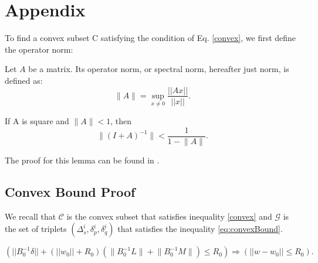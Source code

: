 \appendix
\section{Appendix} \label{AppendixA}
To find a convex subset C satisfying the condition of Eq. \ref{convex},
we first define the operator norm:
\begin{definition}
Let $A$ be a matrix. Its operator norm, or
spectral norm, hereafter just norm, is defined as:
\begin{equation}
\Big \| A \Big \| = \sup_{x \neq 0}\frac{||Ax||}{||x||}.
\end{equation}
\end{definition}

\begin{lemma} \label{lemma:newman}
If A is square and $\Big \| A \Big \| < 1$, then
\begin{equation*}
\Big \| (I+A)^{-1} \Big \| < \frac{1}{1- \Big \|A \Big \|}.
\end{equation*}
\end{lemma}
The proof for this lemma can be found in \cite{gabel2015monitoring}.

\subsection{Convex Bound Proof}
We recall that $\mathcal{C}$ is the convex subset that satisfies
inequality \ref{convex} and $\mathcal{G}$ is the set of triplets
$(\Delta_s^i, \delta_p^i, \delta_q^i)$
 that satisfies the inequality \ref{eq:convexBound}.

\begin{lemma} \label{GinC}
\begin{equation}
(||B_0^{-1}\delta|| + (||w_0||+R_0)(\Big \|B_0^{-1}L\Big \|+\Big \|B_0^{-1}M\Big \|)  \leq R_0) \Rightarrow (||w-w_0|| \leq R_0).
\end{equation}
\end{lemma}

